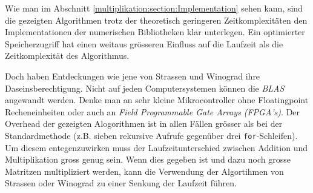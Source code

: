 Wie man im Abschnitt \ref{multiplikation:section:Implementation} sehen kann, sind die gezeigten Algorithmen trotz der theoretisch geringeren Zeitkomplexitäten den Implementationen der numerischen Bibliotheken klar unterlegen.
Ein optimierter Speicherzugriff hat einen weitaus grösseren Einfluss auf die Laufzeit als die Zeitkomplexität des Algorithmus.

Doch haben Entdeckungen wie jene von Strassen und Winograd ihre Daseinsberechtigung.
Nicht auf jeden Computersystemen können die \textit{BLAS} angewandt werden.
Denke man an sehr kleine Mikrocontroller ohne Floatingpoint Recheneinheiten oder auch an \textit{Field Programmable Gate Arrays (FPGA's)}.
Der Overhead der gezeigten Alogorithmen ist in allen Fällen grösser als bei der Standardmethode (z.B. sieben rekursive Aufrufe gegenüber drei \texttt{for}-Schleifen).
Um diesem entegenzuwirken muss der Laufzeitunterschied zwischen Addition und Multiplikation gross genug sein.
Wenn dies gegeben ist und dazu noch grosse Matritzen multipliziert werden, kann die Verwendung der Algortihmen von Strassen oder Winograd zu einer Senkung der Laufzeit führen.

